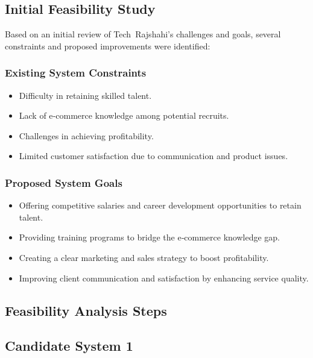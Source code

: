 \documentclass[12pt,a4paper]{article}
\begin{document}
\subsection{Initial Feasibility Study}
Based on an initial review of Tech Rajshahi’s challenges and goals, several constraints and proposed improvements were identified:
\subsubsection{Existing System Constraints}
\begin{itemize}
    \item Difficulty in retaining skilled talent.
    \item Lack of e‑commerce knowledge among potential recruits.
    \item Challenges in achieving profitability.
    \item Limited customer satisfaction due to communication and product issues.
\end{itemize}

\subsubsection{Proposed System Goals}
\begin{itemize}
    \item Offering competitive salaries and career development opportunities to retain talent.
    \item Providing training programs to bridge the e‑commerce knowledge gap.
    \item Creating a clear marketing and sales strategy to boost profitability.
    \item Improving client communication and satisfaction by enhancing service quality.
\end{itemize}

\subsection{Feasibility Analysis Steps}
\subsection*{Candidate System 1}
\end{document}
